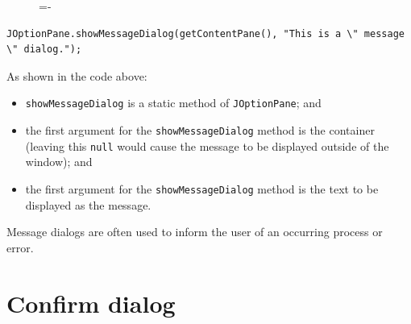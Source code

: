 \documentclass[a4paper]{systems-software}
\begin{document}
\begin{figure}[H]
	\lineskip=-\fboxrule
\end{figure}

\begin{lstlisting}[title={Creating a message dialog.}]
JOptionPane.showMessageDialog(getContentPane(), "This is a \" message \" dialog.");
\end{lstlisting}

As shown in the code above:
\begin{itemize}
	\item \texttt{showMessageDialog} is a static method of \texttt{JOptionPane}; and
	\item the first argument for the \texttt{showMessageDialog} method is the container (leaving this \texttt{null} would cause the message to be displayed outside of the window); and
	\item the first argument for the \texttt{showMessageDialog} method is the text to be displayed as the message.
\end{itemize}

Message dialogs are often used to inform the user of an occurring process or error.



\section*{Confirm dialog}
\end{document}
